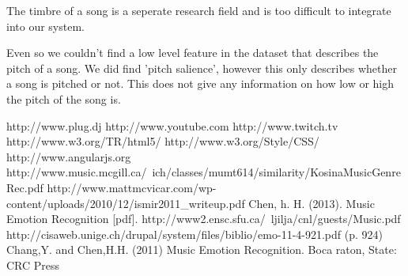 \documentclass[10pt,a4paper]{article}
\begin{document}
The timbre of a song is a seperate research field and is too difficult to integrate into our system.

Even so we couldn't find a low level feature in the dataset that describes the pitch of a song.
We did find 'pitch salience', however this only describes whether a song is pitched or not.
This does not give any information on how low or high the pitch of the song is.

%
%

\begin{thebibliography}{10}
 http://www.plug.dj
 http://www.youtube.com
 http://www.twitch.tv
 http://www.w3.org/TR/html5/
 http://www.w3.org/Style/CSS/
 http://www.angularjs.org
 http://www.music.mcgill.ca/~ich/classes/mumt614/similarity/KosinaMusicGenreRec.pdf
 http://www.mattmcvicar.com/wp-content/uploads/2010/12/ismir2011\_writeup.pdf
 Chen, h. H. (2013). Music Emotion Recognition [pdf]. http://www2.ensc.sfu.ca/~ljilja/cnl/guests/Music.pdf
 http://cisaweb.unige.ch/drupal/system/files/biblio/emo-11-4-921.pdf (p. 924)
 Chang,Y. and Chen,H.H. (2011) Music Emotion Recognition. Boca raton, State: CRC Press %

\end{thebibliography}
\end{document}
